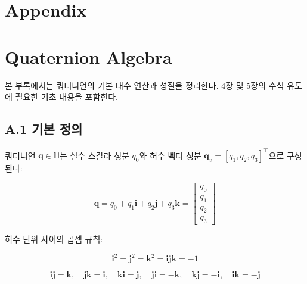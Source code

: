 \section*{Appendix}
 
\appendix
\section{Quaternion Algebra}
\label{app:quaternion}
 
본 부록에서는 쿼터니언의 기본 대수 연산과 성질을 정리한다.
4장 및 5장의 수식 유도에 필요한 기초 내용을 포함한다.
 
\subsection*{A.1 기본 정의}
 
쿼터니언 $\mathbf{q} \in \mathbb{H}$는 실수 스칼라 성분 $q_0$와
허수 벡터 성분 $\mathbf{q}_v = [q_1, q_2, q_3]^\top$으로 구성된다:
 
\begin{equation}
    \mathbf{q} = q_0 + q_1\mathbf{i} + q_2\mathbf{j} + q_3\mathbf{k} =
    \begin{bmatrix} q_0 \\ q_1 \\ q_2 \\ q_3 \end{bmatrix}
    \tag{A.1}
\end{equation}
 
허수 단위 사이의 곱셈 규칙:
 
\begin{equation}
    \mathbf{i}^2 = \mathbf{j}^2 = \mathbf{k}^2 = \mathbf{ijk} = -1
    \tag{A.2}
\end{equation}
 
\begin{equation}
    \mathbf{ij} = \mathbf{k},\quad \mathbf{jk} = \mathbf{i},\quad \mathbf{ki} = \mathbf{j},\quad
    \mathbf{ji} = -\mathbf{k},\quad \mathbf{kj} = -\mathbf{i},\quad \mathbf{ik} = -\mathbf{j}
    \tag{A.3}
\end{equation}
 
